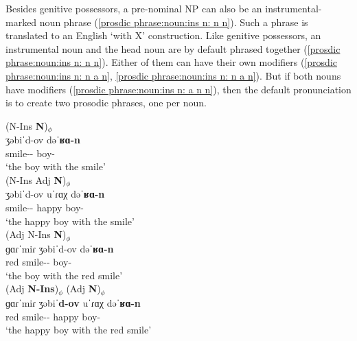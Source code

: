 Besides genitive possessors, a pre-nominal NP can also be an instrumental-marked noun phrase (\ref{prosdic phrase:noun:ins n: n n}). Such a phrase is translated to an English `with X' construction. Like genitive possessors, an instrumental noun and the head noun are by default phrased together (\ref{prosdic phrase:noun:ins n: n n}). Either of them can have their own modifiers (\ref{prosdic phrase:noun:ins n: n a n}, \ref{prosdic phrase:noun:ins n:  n a n}). But if both nouns have modifiers (\ref{prosdic phrase:noun:ins n: a n n}), then the default pronunciation is to create two prosodic phrases, one per noun. 


\begin{exe}
	\ex 
	\begin{xlist}
		\ex \glll (N-Ins \textbf{N})$_\phi$  \\
		ʒəbiˈd-ov dəˈ\textbf{ʁɑ-n}  \\ 
		smile-{\ins}-{} boy-{} \\
		\trans `the boy with the smile'  \label{prosdic phrase:noun:ins n: n n} 
		\\ 
		\ex \glll (N-Ins Adj \textbf{N})$_\phi$  \\
		ʒəbiˈd-ov uˈɾɑχ dəˈ\textbf{ʁɑ-n} \\ 
		smile-{\ins}-{} happy boy-{} \\
		\trans `the happy boy with the smile'  \label{prosdic phrase:noun:ins n: n a n} 
		\\ 
		\ex \glll (Adj N-Ins  \textbf{N})$_\phi$  \\
		ɡɑɾˈmiɾ ʒəbiˈd-ov dəˈ\textbf{ʁɑ-n} \\ 
		red smile-{\ins}-{}   boy-{} \\
		\trans `the  boy with the red smile'  \label{prosdic phrase:noun:ins n:  n a n} 
		\\ 
		\ex \glll (Adj \textbf{N-Ins})$_\phi$  (Adj  \textbf{N})$_\phi$  \\
		ɡɑɾˈmiɾ ʒəbiˈ\textbf{d-ov}   uˈɾɑχ dəˈ\textbf{ʁɑ-n}  \\ 
		red smile-{\ins}-{}  happy  boy-{} \\
		\trans `the  happy boy with the red smile'  \label{prosdic phrase:noun:ins n: a n n} 
		\\ 
	\end{xlist}
\end{exe}



